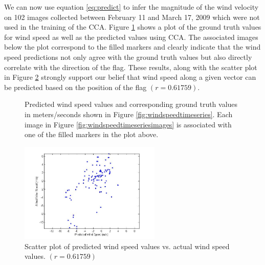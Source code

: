 We can now use equation \ref{eq:predict} to infer the magnitude of the wind velocity on 102 images collected between February 11 and March 17, 2009 which were not used in the training of the CCA. Figure \ref{fig:windpred} shows a plot of the ground truth values for wind speed as well as the predicted values using CCA. The associated images below the plot correspond to the filled markers and clearly indicate that the wind speed predictions not only agree with the ground truth values but also directly correlate with the direction of the flag. These results, along with the scatter plot in Figure \ref{fig:windspeedcorr} strongly support our belief that wind speed along a given vector can be predicted based on the position of the flag  $(r=0.61759)$.
\begin{figure}
	\centering
	\caption[Predicted wind speed values and corresponding ground truth values in meters/seconds]{Predicted wind speed values and corresponding ground truth values in meters/seconds shown in Figure \ref{fig:windspeedtimeseries}. Each image in Figure \ref{fig:windspeedtimeseriesimages} is associated with one of the filled markers in the plot above.}
	\label{fig:windpred}
\end{figure}
\begin{figure}
	\centering
		\includegraphics[width=0.60\textwidth]{figures/windspeedcorr.jpg}
	\caption[Scatter plot of predicted wind speed values vs. actual wind speed values]{Scatter plot of predicted wind speed values vs. actual wind speed values. $(r=0.61759)$}
	\label{fig:windspeedcorr}
\end{figure}

